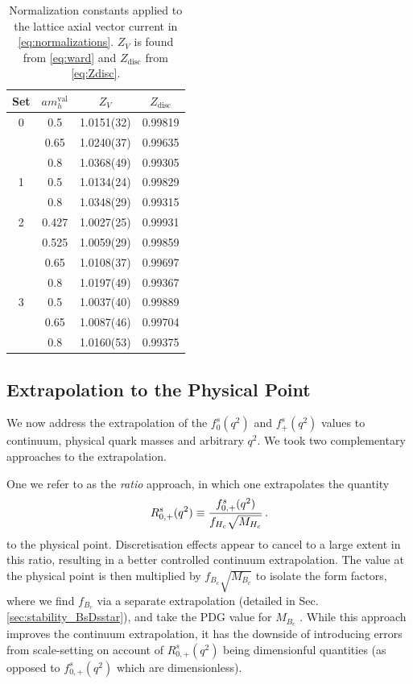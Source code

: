 \begin{table}
\begin{center}
\begin{tabular}{ c c c c }
\hline
Set & $am_h^{\text{val}}$ & $Z_V$& $Z_{\text{disc}}$\\ [0.5ex]
\hline
0 & 0.5 & 1.0151(32) & 0.99819\\ [0.5ex] 
 & 0.65 & 1.0240(37) & 0.99635\\ [0.5ex] 
 & 0.8 & 1.0368(49) & 0.99305\\ [0.5ex] 
\hline
1 & 0.5 & 1.0134(24) & 0.99829\\ [0.5ex] 
 & 0.8 & 1.0348(29) & 0.99315\\ [0.5ex] 
\hline
2 & 0.427 & 1.0027(25) & 0.99931\\ [0.5ex] 
 & 0.525 & 1.0059(29) & 0.99859\\ [0.5ex] 
 & 0.65 & 1.0108(37) & 0.99697\\ [0.5ex] 
 & 0.8 & 1.0197(49) & 0.99367\\ [0.5ex] 
\hline
3 & 0.5 & 1.0037(40) & 0.99889\\ [0.5ex] 
 & 0.65 & 1.0087(46) & 0.99704\\ [0.5ex] 
 & 0.8 & 1.0160(53) & 0.99375\\ [0.5ex] 
\hline
\end{tabular}
    \caption{Normalization constants applied to the lattice axial vector current in \eqref{eq:normalizations}. $Z_V$ is found from \eqref{eq:ward} and $Z_{\text{disc}}$ from \eqref{eq:Zdisc}. \label{tab:norms}}
\end{center}
\end{table}

\subsection{Extrapolation to the Physical Point}
\label{sec:extrapolation}

We now address the extrapolation of the $f_{0}^s(q^2)$ and $f_{+}^s(q^2)$ values to continuum, physical quark masses and arbitrary $q^2$. We took two complementary approaches to the extrapolation.

One we refer to as the {\textit{ratio}} approach, in which one extrapolates the quantity
\begin{align}
  R^s_{0,+}(q^2) \equiv {f^s_{0,+}(q^2)\over f_{H_c}\sqrt{M_{H_c}}}\,.
  \label{eq:ratio}
\end{align}
to the physical point. Discretisation effects appear to cancel to a large extent in this ratio, resulting in a better controlled continuum extrapolation. The value at the physical point is then multiplied by $f_{B_c}\sqrt{M_{B_c}}$ to isolate the form factors, where we find $f_{B_c}$ via a separate extrapolation (detailed in Sec. \ref{sec:stability_BsDsstar}), and take the PDG value for $M_{B_c}$ \cite{PhysRevD.98.030001}. While this approach improves the continuum extrapolation, it has the downside of introducing errors from scale-setting on account of $R_{0,+}^s(q^2)$ being dimensionful quantities (as opposed to $f^s_{0,+}(q^2)$ which are dimensionless).

